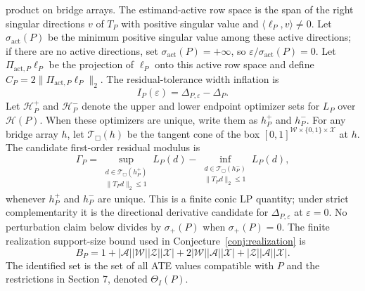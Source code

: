 \documentclass[11pt]{article}
\newcommand{\calH}{\mathcal{H}}
\theoremstyle{definition}
\theoremstyle{plain}
\theoremstyle{remark}
\begin{document}
product on bridge arrays.  The estimand-active row space is the span of the
right singular directions \(v\) of \(T_P\) with positive singular value and
\(\langle \ell_P,v\rangle\neq0\).  Let \(\sigma_{\mathrm{act}}(P)\) be the
minimum positive singular value among these active directions; if there are no
active directions, set \(\sigma_{\mathrm{act}}(P)=+\infty\), so
\(\varepsilon/\sigma_{\mathrm{act}}(P)=0\).  Let
\(\Pi_{\mathrm{act},P}\ell_P\) be the projection of \(\ell_P\) onto this
active row space and define \(C_P=2\|\Pi_{\mathrm{act},P}\ell_P\|_2\).  The
residual-tolerance width inflation is
\[
I_P(\varepsilon)=\Delta_{P,\varepsilon}-\Delta_P.
\]
Let \(\calH_P^+\) and \(\calH_P^-\) denote the upper and lower endpoint
optimizer sets for \(L_P\) over \(\calH(P)\).  When these optimizers are
unique, write them as \(h_P^+\) and \(h_P^-\).  For any bridge array \(h\),
let \(\mathcal T_{\Box}(h)\) be the tangent cone of the box
\([0,1]^{\mathcal W\times\{0,1\}\times\mathcal X}\) at \(h\).  The candidate
first-order residual modulus is
\[
\Gamma_P=
\sup_{\substack{d\in\mathcal T_{\Box}(h_P^+)\\ \|T_Pd\|_2\le1}}L_P(d)
-
\inf_{\substack{d\in\mathcal T_{\Box}(h_P^-)\\ \|T_Pd\|_2\le1}}L_P(d),
\]
whenever \(h_P^+\) and \(h_P^-\) are unique.  This is a finite conic LP
quantity; under strict complementarity it is the directional derivative
candidate for \(\Delta_{P,\varepsilon}\) at \(\varepsilon=0\).
No perturbation claim below divides by \(\sigma_+(P)\) when
\(\sigma_+(P)=0\).
The finite realization support-size bound used in
Conjecture~\ref{conj:realization} is
\[
B_P
=1+
|\mathcal A||\mathcal W||\mathcal Z||\mathcal X|
+2|\mathcal W||\mathcal A||\mathcal X|
+|\mathcal Z||\mathcal A||\mathcal X|.
\]
The identified set is the set of all ATE values compatible with \(P\) and the
restrictions in Section 7, denoted \(\Theta_I(P)\).
\end{document}
